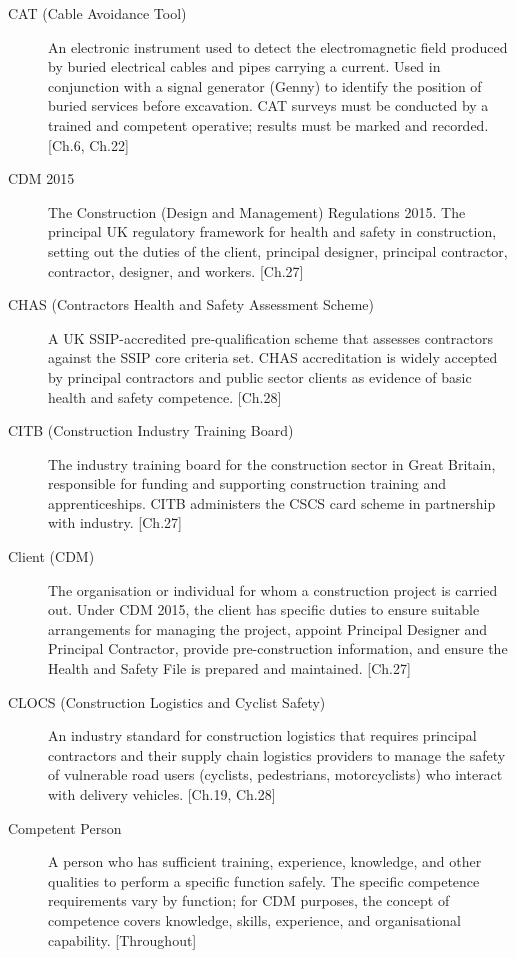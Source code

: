 \begin{description}
\item[CAT (Cable Avoidance Tool)] An electronic instrument used to detect the electromagnetic field produced by buried electrical cables and pipes carrying a current. Used in conjunction with a signal generator (Genny) to identify the position of buried services before excavation. CAT surveys must be conducted by a trained and competent operative; results must be marked and recorded. [Ch.6, Ch.22]

\item[CDM 2015] The Construction (Design and Management) Regulations 2015. The principal UK regulatory framework for health and safety in construction, setting out the duties of the client, principal designer, principal contractor, contractor, designer, and workers. [Ch.27]

\item[CHAS (Contractors Health and Safety Assessment Scheme)] A UK SSIP-accredited pre-qualification scheme that assesses contractors against the SSIP core criteria set. CHAS accreditation is widely accepted by principal contractors and public sector clients as evidence of basic health and safety competence. [Ch.28]

\item[CITB (Construction Industry Training Board)] The industry training board for the construction sector in Great Britain, responsible for funding and supporting construction training and apprenticeships. CITB administers the CSCS card scheme in partnership with industry. [Ch.27]

\item[Client (CDM)] The organisation or individual for whom a construction project is carried out. Under CDM 2015, the client has specific duties to ensure suitable arrangements for managing the project, appoint Principal Designer and Principal Contractor, provide pre-construction information, and ensure the Health and Safety File is prepared and maintained. [Ch.27]

\item[CLOCS (Construction Logistics and Cyclist Safety)] An industry standard for construction logistics that requires principal contractors and their supply chain logistics providers to manage the safety of vulnerable road users (cyclists, pedestrians, motorcyclists) who interact with delivery vehicles. [Ch.19, Ch.28]

\item[Competent Person] A person who has sufficient training, experience, knowledge, and other qualities to perform a specific function safely. The specific competence requirements vary by function; for CDM purposes, the concept of competence covers knowledge, skills, experience, and organisational capability. [Throughout]


\end{description}

